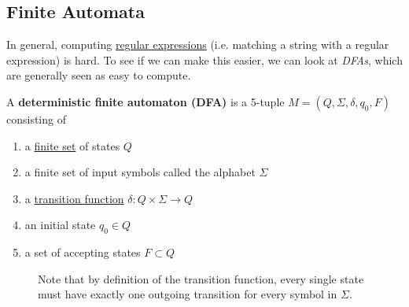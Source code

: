  \begin{example}
    \label{ex:counterexamples-to-writing-balanced-parentheses}
    
  \end{example}

\subsection{Finite Automata}

  In general, computing \hyperref[def:regular_expression]{regular expressions} (i.e. matching a string with a regular expression) is hard. To see if we can make this easier, we can look at \textit{DFAs}, which are generally seen as easy to compute. 

  \begin{definition}
		\label{def:dfa}
    A \textbf{deterministic finite automaton (DFA)} is a 5-tuple $M = (Q, \Sigma, \delta, q_0, F)$ consisting of 
    \begin{enumerate}
      \item a \hyperref[st-def:finite-set]{finite set} of states $Q$
      \item a finite set of input symbols called the alphabet $\Sigma$
      \item a \hyperref[sm-def:transition-function]{transition function} $\delta: Q \times \Sigma \to Q$
      \item an initial state $q_0 \in Q$ 
      \item a set of accepting states $F \subset Q$
    \end{enumerate}

    \begin{figure}[H]
      \centering 
      \caption{Note that by definition of the transition function, every single state must have exactly one outgoing transition for every symbol in $\Sigma$.} 
      \label{fig:dfa}
    \end{figure}
  \end{definition}


